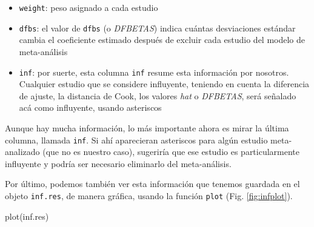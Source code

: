 \documentclass[
  bookmarksnumbered]{article}
\newenvironment{Shaded}{\begin{snugshade}}{\end{snugshade}}
\newcommand{\FunctionTok}[1]{\textcolor[rgb]{0.39,0.29,0.61}{#1}}
\newcommand{\NormalTok}[1]{\textcolor[rgb]{0.12,0.11,0.11}{#1}}
\begin{document}
\begin{itemize}
\item
  \texttt{weight}: peso asignado a cada estudio
\item
  \texttt{dfbs}: el valor de \texttt{dfbs} (o \emph{DFBETAS}) indica cuántas desviaciones estándar cambia el coeficiente estimado después de excluir cada estudio del modelo de meta-análisis
\item
  \texttt{inf}: por suerte, esta columna \texttt{inf} resume esta información por nosotros. Cualquier estudio que se considere influyente, teniendo en cuenta la diferencia de ajuste, la distancia de Cook, los valores \emph{hat} o \emph{DFBETAS}, será señalado acá como influyente, usando asteriscos
\end{itemize}

Aunque hay mucha información, lo más importante ahora es mirar la última columna, llamada \texttt{inf}. Si ahí aparecieran asteriscos para algún estudio meta-analizado (que no es nuestro caso), sugeriría que ese estudio es particularmente influyente y podría ser necesario eliminarlo del meta-análisis.

Por último, podemos también ver esta información que tenemos guardada en el objeto \texttt{inf.res}, de manera gráfica, usando la función \texttt{plot} (Fig. \ref{fig:infplot}).

\begin{Shaded}
\begin{Highlighting}[]
\FunctionTok{plot}\NormalTok{(inf.res)}
\end{Highlighting}
\end{Shaded}
\end{document}
